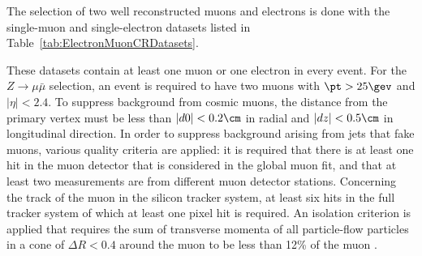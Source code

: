 The selection of two well reconstructed muons and electrons is done with the single-muon and single-electron datasets listed in Table~\ref{tab:ElectronMuonCRDatasets}.
\renewcommand{\arraystretch}{1.5}
\begin{table}[!h]
\centering
\caption{Datasets used for the determination of the fake rate.}
\label{tab:ElectronMuonCRDatasets}
\end{table}
These datasets contain at least one muon or one electron in every event.
For the $Z\rightarrow\mu\bar{\mu}$ selection, an event is required to have two muons with $\pt>25\gev$ and $|\eta|<2.4$.
To suppress background from cosmic muons, the distance from the primary vertex must be less than $|d0|<0.2\cm$ in radial and $|dz|<0.5\cm$ in longitudinal direction.
In order to suppress background arising from jets that fake muons, various quality criteria are applied: it is required that there is at least one hit in the muon detector that is considered in the global muon fit, 
and that at least two measurements are from different muon detector stations.
Concerning the track of the muon in the silicon tracker system, at least six hits in the full tracker system of which at least one pixel hit is required. %
An isolation criterion is applied that requires the sum of transverse momenta of all particle-flow particles in a cone of $\Delta R<0.4$ around the muon to be less than 12\% of the muon \pt.
